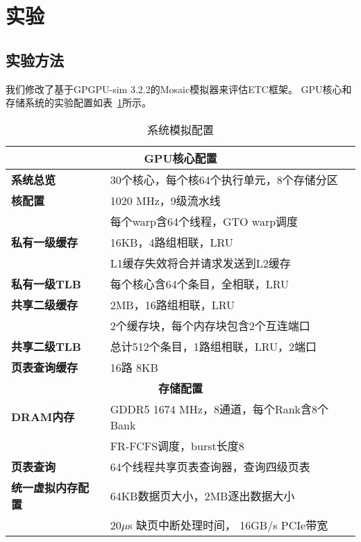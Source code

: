 \section{实验}

\subsection{实验方法}

我们修改了基于GPGPU-sim 3.2.2的Mosaic模拟器来评估ETC框架。
GPU核心和存储系统的实验配置如表~\ref{table:config}所示。

\begin{table}[h!]
\centering
\begin{tabular}{ll}
\hline \hline
\multicolumn{2}{c}{\textbf{GPU核心配置}} \\ \hline
\textbf{系统总览}           &  30个核心，每个核64个执行单元，8个存储分区\\
\textbf{核配置}           &  1020 MHz，9级流水线 \\ & 每个warp含64个线程，GTO warp调度\\
\textbf{私有一级缓存}    &  16KB，4路组相联，LRU \\ & L1缓存失效将合并请求发送到L2缓存\\
\textbf{私有一级TLB}    &  每个核心含64个条目，全相联，LRU\\
\textbf{共享二级缓存}   &  2MB，16路组相联，LRU \\ & 2个缓存块，每个内存块包含2个互连端口\\
\textbf{共享二级TLB}   &  总计512个条目，1路组相联，LRU，2端口\\
\textbf{页表查询缓存}    &  16路 8KB\\
\hline
\multicolumn{2}{c}{\textbf{存储配置}} \\
\hline
\textbf{DRAM内存}   & GDDR5 1674 MHz，8通道，每个Rank含8个Bank \\ & FR-FCFS调度，burst长度8\\
\textbf{页表查询}   & 64个线程共享页表查询器，查询四级页表\\
\textbf{统一虚拟内存配置} & 64KB数据页大小，2MB逐出数据大小\\ & 20$\mu$s 缺页中断处理时间， 16GB/s PCIe带宽  \\
                              
\hline
\end{tabular}
\caption{系统模拟配置}
\label{table:config}
\end{table}




